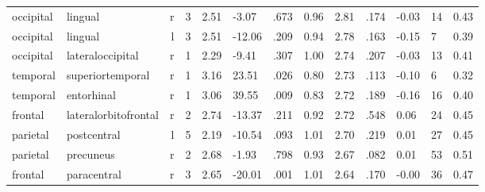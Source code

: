\documentclass{article}
\begin{document}
\begin{longtable}{llrR{1.3cm}R{1cm}R{1.3cm}R{1cm}R{1cm}R{1.3cm}R{1cm}R{1.8cm}R{1.3cm}R{1.8cm}}
 occipital &                   lingual &    r &         3 &                  2.51 &            -3.07 &               .673 &                               0.96 &                          2.81 &                            .174 &  -0.03 &     14 &      0.43 \\
 occipital &                   lingual &    l &         3 &                  2.51 &           -12.06 &               .209 &                               0.94 &                          2.78 &                            .163 &  -0.15 &      7 &      0.39 \\
 occipital &          lateraloccipital &    r &         1 &                  2.29 &            -9.41 &               .307 &                               1.00 &                          2.74 &                            .207 &  -0.03 &     13 &      0.41 \\
  temporal &          superiortemporal &    r &         1 &                  3.16 &            23.51 &               .026 &                               0.80 &                          2.73 &                            .113 &  -0.10 &      6 &      0.32 \\
  temporal &                entorhinal &    r &         1 &                  3.06 &            39.55 &               .009 &                               0.83 &                          2.72 &                            .189 &  -0.16 &     16 &      0.40 \\
   frontal &      lateralorbitofrontal &    r &         2 &                  2.74 &           -13.37 &               .211 &                               0.92 &                          2.72 &                            .548 &   0.06 &     24 &      0.45 \\
  parietal &               postcentral &    l &         5 &                  2.19 &           -10.54 &               .093 &                               1.01 &                          2.70 &                            .219 &   0.01 &     27 &      0.45 \\
  parietal &                 precuneus &    r &         2 &                  2.68 &            -1.93 &               .798 &                               0.93 &                          2.67 &                            .082 &   0.01 &     53 &      0.51 \\
   frontal &               paracentral &    r &         3 &                  2.65 &           -20.01 &               .001 &                               1.01 &                          2.64 &                            .170 &  -0.00 &     36 &      0.47 \\

\end{longtable}
\end{document}
